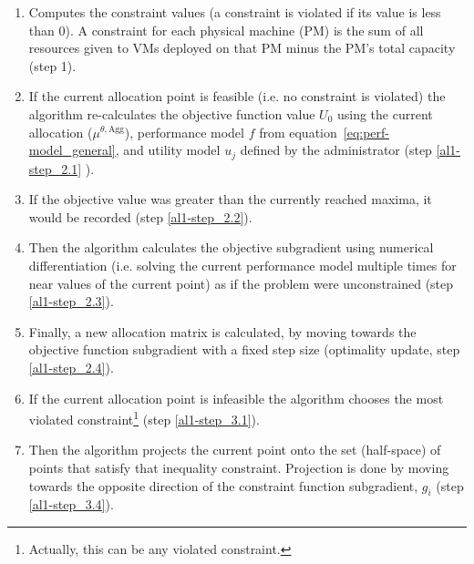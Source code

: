 \begin{enumerate}

\item  Computes the constraint values (a constraint is violated if its value is less than 0). A constraint for each physical machine (PM) is the sum of all resources given to VMs deployed on that PM minus the PM's total capacity (step 1).
\item  If the current allocation point is feasible (i.e. no constraint is violated) the algorithm re-calculates the objective function value $U_0$ using the current allocation ($\mu^{\theta,\text{Agg}}$), performance model $f$ from equation~\ref{eq:perf-model_general}, and utility model $u_j$ defined by the administrator (step \ref{al1-step_2.1} ). 
\item If the objective value was greater than the currently reached maxima, it would be recorded (step \ref{al1-step_2.2}).
\item Then the algorithm calculates the objective subgradient using numerical differentiation (i.e. solving the current performance model multiple times for near values of the current point) as if the problem were unconstrained (step \ref{al1-step_2.3}).
\item Finally, a new allocation matrix is calculated, by moving towards the objective function subgradient with a fixed step size (optimality update, step \ref{al1-step_2.4}).
\item If the current allocation point is infeasible the algorithm chooses the most violated constraint\footnote{Actually, this can be any violated constraint.} (step \ref{al1-step_3.1}).
\item Then the algorithm projects the current point onto the set (half-space) of points that satisfy that inequality constraint. 
 Projection is done by moving towards the opposite direction of the constraint function subgradient, $g_i$ (step \ref{al1-step_3.4}).

\end{enumerate}
